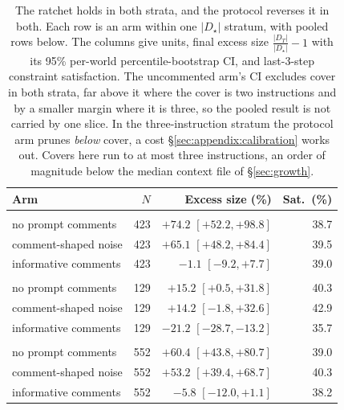 \begin{table}[t]
  \centering\small
  \begin{tabularx}{\textwidth}{@{}>{\raggedright\arraybackslash}Xrrr@{}}
    \toprule
    Arm & $N$ & Excess size (\%) & Sat.\ (\%) \\
    \midrule
    \multicolumn{4}{@{}l}{\emph{$|D_\star| = 2$}} \\
    no prompt comments & 423 & $+74.2$ $[+52.2, +98.8]$ & 38.7 \\
    comment-shaped noise & 423 & $+65.1$ $[+48.2, +84.4]$ & 39.5 \\
    informative comments & 423 & $-1.1$ $[-9.2, +7.7]$ & 39.0 \\
    \midrule
    \multicolumn{4}{@{}l}{\emph{$|D_\star| = 3$}} \\
    no prompt comments & 129 & $+15.2$ $[+0.5, +31.8]$ & 40.3 \\
    comment-shaped noise & 129 & $+14.2$ $[-1.8, +32.6]$ & 42.9 \\
    informative comments & 129 & $-21.2$ $[-28.7, -13.2]$ & 35.7 \\
    \midrule
    \multicolumn{4}{@{}l}{\emph{pooled}} \\
    no prompt comments & 552 & $+60.4$ $[+43.8, +80.7]$ & 39.0 \\
    comment-shaped noise & 552 & $+53.2$ $[+39.4, +68.7]$ & 40.3 \\
    informative comments & 552 & $-5.8$ $[-12.0, +1.1]$ & 38.2 \\
    \bottomrule
  \end{tabularx}
  \caption{
    The ratchet holds in both strata, and the protocol reverses it in both. Each row is an arm
    within one $|D_\star|$ stratum, with pooled rows below. The columns give units, final excess
    size $\frac{|D_T|}{|D_\star|}{-}1$ with its 95\% per-world percentile-bootstrap CI, and
    last-3-step constraint satisfaction. The uncommented arm's CI excludes cover in both strata,
    far above it where the cover is two instructions and by a smaller margin where it is three, so
    the pooled result is not carried by one slice. In the three-instruction stratum the protocol
    arm prunes \emph{below} cover, a cost \S\ref{sec:appendix:calibration} works out. Covers here
    run to at most three instructions, an order of magnitude below the median context file of
    \S\ref{sec:growth}.
  }
  \label{tab:strata}
\end{table}
